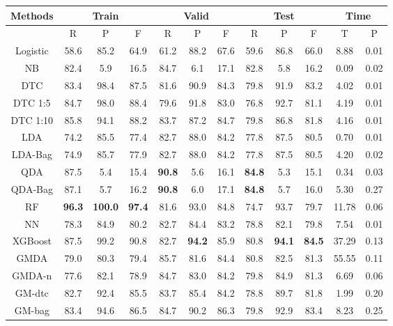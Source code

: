 \documentclass[english]{article}
\begin{document}
\begin{table}[h]
	\centering
	\setlength{\belowcaptionskip}{10pt}
	\begin{tabular}{|c|c|c|c|c|c|c|c|c|c|c|c|}
	\hline
	Methods & \multicolumn{3}{|c|}{Train} & \multicolumn{3}{|c|}{Valid} & \multicolumn{3}{|c|}{Test} & \multicolumn{2}{|c|}{Time}\\
	\hline
	& R & P & F & R & P & F & R & P & F & T & P\\
	\hline
Logistic & 58.6 & 85.2 & 64.9 & 61.2 & 88.2 & 67.6 & 59.6 & 86.8 & 66.0 & 8.88 & 0.01\\
\hline
NB & 82.4 & 5.9 & 16.5 & 84.7 & 6.1 & 17.1 & 82.8 & 5.8 & 16.2 & 0.09 & 0.02\\
\hline
DTC & 83.4 & 98.4 & 87.5 & 81.6 & 90.9 & 84.3 & 79.8 & 91.9 & 83.2 & 4.02 & 0.01\\
\hline
DTC 1:5 & 84.7 & 98.0 & 88.4 & 79.6 & 91.8 & 83.0 & 76.8 & 92.7 & 81.1 & 4.19 & 0.01\\
\hline
DTC 1:10 & 85.8 & 94.1 & 88.2 & 83.7 & 87.2 & 84.7 & 79.8 & 86.8 & 81.8 & 4.16 & 0.01\\
\hline
LDA & 74.2 & 85.5 & 77.4 & 82.7 & 88.0 & 84.2 & 77.8 & 87.5 & 80.5 & 0.70 & 0.01\\
\hline
LDA-Bag & 74.9 & 85.7 & 77.9 & 82.7 & 88.0 & 84.2 & 77.8 & 87.5 & 80.5 & 4.20 & 0.02\\
\hline
QDA & 87.5 & 5.4 & 15.4 & \textbf{90.8} & 5.6 & 16.1 & \textbf{84.8} & 5.3 & 15.1 & 0.34 & 0.03\\
\hline
QDA-Bag & 87.1 & 5.7 & 16.2 & \textbf{90.8} & 6.0 & 17.1 & \textbf{84.8} & 5.7 & 16.0 & 5.30 & 0.27\\
\hline
RF & \textbf{96.3} & \textbf{100.0} & \textbf{97.4} & 81.6 & 93.0 & 84.8 & 74.7 & 93.7 & 79.7 & 11.78 & 0.06\\
\hline
NN & 78.3 & 84.9 & 80.2 & 82.7 & 84.4 & 83.2 & 78.8 & 82.1 & 79.8 & 7.54 & 0.01\\
\hline
XGBoost & 87.5 & 99.2 & 90.8 & 82.7 & \textbf{94.2} & 85.9 & 80.8 & \textbf{94.1} & \textbf{84.5} & 37.29 & 0.13\\
\hline
GMDA & 79.0 & 80.3 & 79.4 & 85.7 & 81.6 & 84.4 & 80.8 & 82.5 & 81.3 & 55.55 & 0.11 \\
\hline
GMDA-n & 77.6 & 82.1 & 78.9 & 84.7 & 83.0 & 84.2 & 79.8 & 84.9 & 81.3 & 6.69 & 0.06 \\
\hline
GM-dtc & 82.7 & 92.4 & 85.5 & 83.7 & 85.4 & 84.2 & 78.8 & 89.7 & 81.8 & 1.99 & 0.20 \\
\hline
GM-bag & 83.4 & 94.6 & 86.5 & 84.7 & 90.2 & 86.3 & 79.8 & 92.9 & 83.4 & 8.23 & 0.25 \\

\end{tabular}
\end{table}
\end{document}
